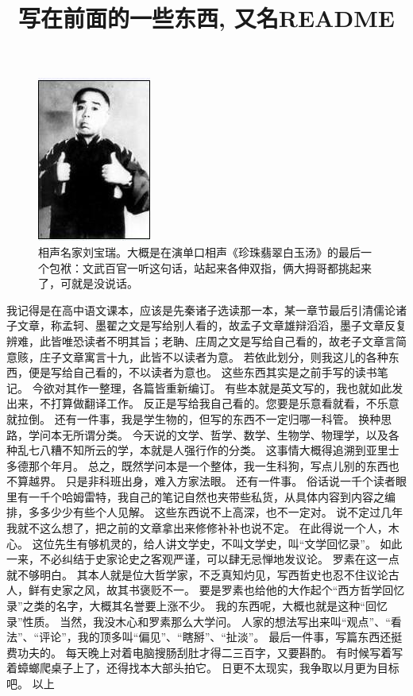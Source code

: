 \documentclass{article}
\title{写在前面的一些东西, 又名README}
\begin{document}
\maketitle

\begin{figure}
  \centering
  \includegraphics{Figures/刘宝瑞.jpg}
  \caption{相声名家刘宝瑞。大概是在演单口相声《珍珠翡翠白玉汤》的最后一个包袱：文武百官一听这句话，站起来各伸双指，俩大拇哥都挑起来了，可就是没说话。}
\end{figure}
  
  \newpage
  \linenumbers

我记得是在高中语文课本，应该是先秦诸子选读那一本，某一章节最后引清儒论诸子文章，称孟轲、墨翟之文是写给别人看的，故孟子文章雄辩滔滔，墨子文章反复辨难，此皆唯恐读者不明其旨；老聃、庄周之文是写给自己看的，故老子文章言简意赅，庄子文章寓言十九，此皆不以读者为意。
若依此划分，则我这儿的各种东西，便是写给自己看的，不以读者为意也。
\newline
这些东西其实是之前手写的读书笔记。
今欲对其作一整理，各篇皆重新编订。
有些本就是英文写的，我也就如此发出来，不打算做翻译工作。
反正是写给我自己看的。您要是乐意看就看，不乐意就拉倒。
\newline
还有一件事，我是学生物的，但写的东西不一定归哪一科管。
换种思路，学问本无所谓分类。
今天说的文学、哲学、数学、生物学、物理学，以及各种乱七八糟不知所云的学，本就是人强行作的分类。
这事情大概得追溯到亚里士多德那个年月。
总之，既然学问本是一个整体，我一生科狗，写点儿别的东西也不算越界。
只是非科班出身，难入方家法眼。
\newline
还有一件事。
俗话说一千个读者眼里有一千个哈姆雷特，我自己的笔记自然也夹带些私货，从具体内容到内容之编排，多多少少有些个人见解。
这些东西说不上高深，也不一定对。
说不定过几年我就不这么想了，把之前的文章拿出来修修补补也说不定。
在此得说一个人，木心。
这位先生有够机灵的，给人讲文学史，不叫文学史，叫“文学回忆录”。
如此一来，不必纠结于史家论史之客观严谨，可以肆无忌惮地发议论。
罗素在这一点就不够明白。
其本人就是位大哲学家，不乏真知灼见，写西哲史也忍不住议论古人，鲜有史家之风，故其书褒贬不一。
要是罗素也给他的大作起个“西方哲学回忆录”之类的名字，大概其名誉要上涨不少。
我的东西呢，大概也就是这种“回忆录”性质。
当然，我没木心和罗素那么大学问。
人家的想法写出来叫“观点”、“看法”、“评论”，我的顶多叫“偏见”、“瞎掰”、“扯淡”。
\newline
最后一件事，写篇东西还挺费功夫的。
每天晚上对着电脑搜肠刮肚才得二三百字，又要斟酌。
有时候写着写着蟑螂爬桌子上了，还得找本大部头拍它。
日更不太现实，我争取以月更为目标吧。
\newline
以上    
\end{document}
